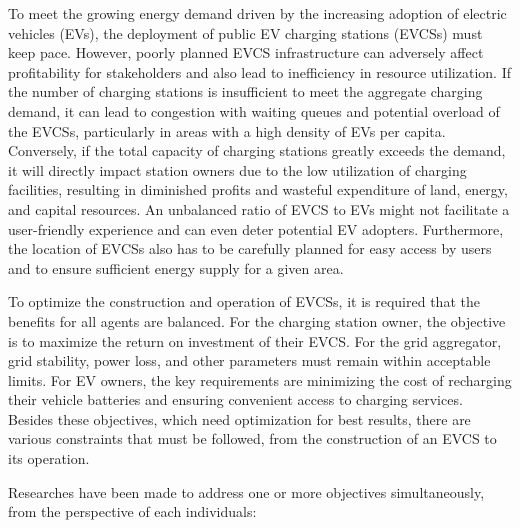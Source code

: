 \documentclass{thesis}
\begin{document}
   \label{chuong4}
    
\setcounter{section}{4}
    \setcounter{subsection}{0}
        \setcounter{figure}{0}
            \setcounter{table}{0}
\sloppy

To meet the growing energy demand driven by the increasing adoption of electric vehicles (EVs), the deployment of public EV charging stations (EVCSs) must keep pace. However, poorly planned EVCS infrastructure can adversely affect profitability for stakeholders and also lead to inefficiency in resource utilization. If the number of charging stations is insufficient to meet the aggregate charging demand, it can lead to congestion with waiting queues and potential overload of the EVCSs, particularly in areas with a high density of EVs per capita. Conversely, if the total capacity of charging stations greatly exceeds the demand, it will directly impact station owners due to the low utilization of charging facilities, resulting in diminished profits and wasteful expenditure of land, energy, and capital resources. An unbalanced ratio of EVCS to EVs might not facilitate a user-friendly experience and can even deter potential EV adopters. Furthermore, the location of EVCSs also has to be carefully planned for easy access by users and to ensure sufficient energy supply for a given area.

To optimize the construction and operation of EVCSs, it is required that the benefits for all agents are balanced. For the charging station owner, the objective is to maximize the return on investment of their EVCS. For the grid aggregator, grid stability, power loss, and other parameters must remain within acceptable limits. For EV owners, the key requirements are minimizing the cost of recharging their vehicle batteries and ensuring convenient access to charging services. Besides these objectives, which need optimization for best results, there are various constraints that must be followed, from the construction of an EVCS to its operation.

Researches have been made to address one or more objectives simultaneously, from the perspective of each individuals: 
\end{document}
